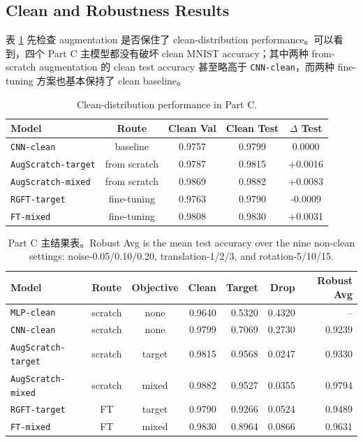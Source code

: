 \documentclass[12pt,a4paper,fontset=fandol]{ctexart}
\begin{document}
\subsection{Clean and Robustness Results}

表 \ref{tab:partc_clean_table} 先检查 augmentation 是否保住了 clean-distribution performance。可以看到，四个 Part C 主模型都没有破坏 clean MNIST accuracy；其中两种 from-scratch augmentation 的 clean test accuracy 甚至略高于 \texttt{CNN-clean}，而两种 fine-tuning 方案也基本保持了 clean baseline。

\begin{table}[H]
  \centering
  \small
  \caption{Clean-distribution performance in Part C.}
  \label{tab:partc_clean_table}
  \renewcommand{\arraystretch}{1.08}
  \setlength{\tabcolsep}{7pt}
  \begin{tabular}{lcccc}
    \toprule
    Model & Route & Clean Val & Clean Test & $\Delta$ Test \\
    \midrule
    \texttt{CNN-clean} & baseline & 0.9757 & 0.9799 & 0.0000 \\
    \texttt{AugScratch-target} & from scratch & 0.9787 & 0.9815 & +0.0016 \\
    \texttt{AugScratch-mixed} & from scratch & 0.9869 & 0.9882 & +0.0083 \\
    \texttt{RGFT-target} & fine-tuning & 0.9763 & 0.9790 & -0.0009 \\
    \texttt{FT-mixed} & fine-tuning & 0.9808 & 0.9830 & +0.0031 \\
    \bottomrule
  \end{tabular}
\end{table}

\begin{table}[H]
  \centering
  \scriptsize
  \caption{Part C 主结果表。Robust Avg is the mean test accuracy over the nine non-clean settings: noise-0.05/0.10/0.20, translation-1/2/3, and rotation-5/10/15.}
  \label{tab:partc_main_2x2}
  \renewcommand{\arraystretch}{1.20}
  \setlength{\tabcolsep}{8pt}
  \begin{tabular}{lccrrrr}
    \toprule
    Model & Route & Objective & Clean & Target & Drop & Robust Avg \\
    \midrule
    \texttt{MLP-clean} & scratch & none & 0.9640 & 0.5320 & 0.4320 & -- \\
    \texttt{CNN-clean} & scratch & none & 0.9799 & 0.7069 & 0.2730 & 0.9239 \\
    \texttt{AugScratch-target} & scratch & target & 0.9815 & 0.9568 & 0.0247 & 0.9330 \\
    \texttt{AugScratch-mixed} & scratch & mixed & 0.9882 & 0.9527 & 0.0355 & 0.9794 \\
    \texttt{RGFT-target} & FT & target & 0.9790 & 0.9266 & 0.0524 & 0.9489 \\
    \texttt{FT-mixed} & FT & mixed & 0.9830 & 0.8964 & 0.0866 & 0.9631 \\
    \bottomrule
  \end{tabular}
\end{table}
\end{document}
